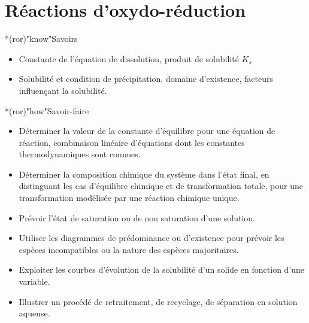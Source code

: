 \documentclass[../../main/main.tex]{subfiles}
\begin{document}
\setcounter{chapter}{5}


\chapter{R\'eactions d'oxydo-r\'eduction}

\vspace*{\fill}

\begin{prgm}
	\begin{tcb}*(ror)"know"{Savoirs}
		\begin{itemize}
			\item Constante de l'équation de dissolution, produit de solubilité $K_s$
			\item Solubilité et condition de précipitation, domaine d'existence,
			      facteurs influençant la solubilité.
		\end{itemize}
	\end{tcb}
	\begin{tcb}*(ror)"how"{Savoir-faire}
		\begin{itemize}
			\item Déterminer la valeur de la constante d'équilibre pour une équation
			      de réaction, combinaison linéaire d'équations dont les constantes
			      thermodynamiques sont connues.
			\item Déterminer la composition chimique du système dans l'état final, en
			      distinguant les cas d'équilibre chimique et de transformation totale,
			      pour une transformation modélisée par une réaction chimique unique.
			\item Prévoir l'état de saturation ou de non saturation d'une solution.
			\item Utiliser les diagrammes de prédominance ou d'existence pour prévoir
			      les espèces incompatibles ou la nature des espèces majoritaires.
			\item Exploiter les courbes d'évolution de la solubilité d'un solide en
			      fonction d'une variable.
			\item Illustrer un procédé de retraitement, de recyclage, de séparation
			      en solution aqueuse.
		\end{itemize}
	\end{tcb}
\end{prgm}

\vspace*{\fill}
\minitoc
\vspace*{\fill}
\end{document}
